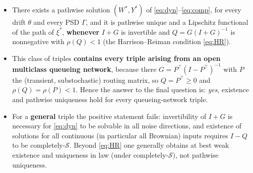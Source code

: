 \documentclass{amsart}
\theoremstyle{definition}
\theoremstyle{remark}
\begin{document}
\begin{itemize}
\item There exists a pathwise solution $(W^\ast,Y^\ast)$ of
\eqref{eq:dyn}--\eqref{eq:comp}, for every drift $\theta$ and every PSD
$\Gamma$, and it is pathwise unique and a Lipschitz functional of the path of
$\xi^\ast$, \textbf{whenever} $I+G$ is invertible and $Q=G(I+G)^{-1}$ is
nonnegative with $\rho(Q)<1$ (the Harrison--Reiman condition \eqref{eq:HR}).
\item This class of triples \textbf{contains every triple arising from an open
multiclass queueing network}, because there $G=P^\top(I-P^\top)^{-1}$ with $P$
the (transient, substochastic) routing matrix, so $Q=P^\top\ge0$ and
$\rho(Q)=\rho(P)<1$. Hence the answer to the final question is: \emph{yes},
existence and pathwise uniqueness hold for every queueing-network triple.
\item For a \textbf{general} triple the positive statement fails: invertibility
of $I+G$ is necessary for \eqref{eq:dyn} to be solvable in all noise directions,
and existence of solutions for all continuous (in particular all Brownian)
inputs requires $I-Q$ to be completely-$\mathcal S$. Beyond \eqref{eq:HR} one
generally obtains at best weak existence and uniqueness in law (under
completely-$\mathcal S$), not pathwise uniqueness.
\end{itemize}
\end{document}
